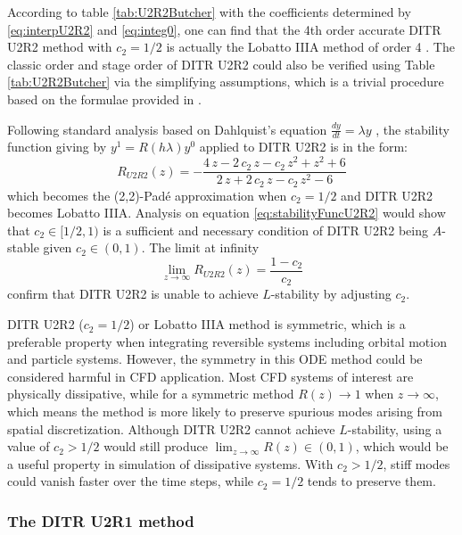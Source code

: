 According to table \ref{tab:U2R2Butcher} with the coefficients
determined by \eqref{eq:interpU2R2} and \eqref{eq:integ0},
one can find that the 4th order accurate
DITR U2R2 method with $c_2=1/2$
is actually the Lobatto IIIA method
of order 4 \cite{wanner1996solving}.
The classic order and stage order of DITR U2R2 could
also be verified using Table \ref{tab:U2R2Butcher} via
the simplifying assumptions, which is a trivial procedure
based on the formulae provided in \cite{wanner1996solving}.

Following standard analysis based on Dahlquist's equation
$\frac{dy}{dt} = \lambda y$ \cite{wanner1996solving},
the stability function giving by $y^{1}=R(h\lambda)y^0$
applied to DITR U2R2 is in the form:
\begin{equation}
    \label{eq:stabilityFuncU2R2}
    R_{U2R2}(z) = -\frac{4\,z-2\,c_{2}\,z-c_{2}\,z^2+z^2+6}{2\,z+2\,c_{2}\,z-c_{2}\,z^2-6}
\end{equation}
which becomes the (2,2)-Pad{\'e} approximation when $c_2=1/2$ and
DITR U2R2 becomes Lobatto IIIA.
Analysis on equation \eqref{eq:stabilityFuncU2R2}
would show that $c_2\in[1/2,1)$ is a sufficient and necessary
condition of DITR U2R2 being $A$-stable given $c_2\in(0,1)$.
The limit at infinity
\begin{equation}
    \lim_{z\rightarrow\infty}R_{U2R2}(z) = \frac{1-c_2}{c_2}
\end{equation}
confirm that DITR U2R2 is unable to achieve $L$-stability
by adjusting $c_2$.


DITR U2R2 ($c_2=1/2$) or Lobatto IIIA method is symmetric,
which is a preferable property when integrating
reversible systems including orbital motion and particle
systems.
However,
the symmetry in this ODE method could be considered harmful in CFD application.
Most CFD systems of interest are physically dissipative,
while for a symmetric method
$R(z) \rightarrow 1$ when $z \rightarrow \infty$,
which means the method is more likely to preserve
spurious modes arising from spatial discretization.
Although DITR U2R2 cannot achieve $L$-stability,
using a value of $c_2 > 1/2$ would still
produce $\lim_{z\rightarrow\infty}R(z)\in(0,1)$, which
would be a useful property in simulation of dissipative systems.
With  $c_2 > 1/2$, stiff modes could vanish faster over the time
steps, while $c_2 = 1/2$ tends to preserve them.

\subsubsection{The DITR U2R1 method}

